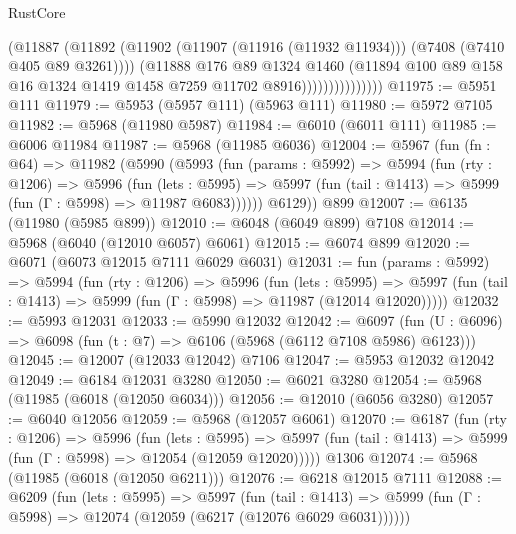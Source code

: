 \begin{lexlean}{RustCore}
\begin{coremodule}
                            (@11887
                              (@11892
                                (@11902
                                  (@11907 (@11916 (@11932 @11934)))
                                  (@7408 (@7410 @405 @89 @3261))))
                              (@11888
                                @176
                                @89
                                @1324
                                @1460
                                (@11894
                                  @100
                                  @89
                                  @158
                                  @16
                                  @1324
                                  @1419
                                  @1458
                                  @7259
                                  @11702
                                  @8916)))))))))))))))
@11975 := @5951 @111
@11979 := @5953 (@5957 @111) (@5963 @111)
@11980 := @5972 @7105
@11982 := @5968 (@11980 @5987)
@11984 := @6010 (@6011 @111)
@11985 := @6006 @11984
@11987 := @5968 (@11985 @6036)
@12004 := @5967
    (fun (fn : @64) =>
    @11982
      (@5990
        (@5993
          (fun (params : @5992) =>
          @5994
            (fun (rty : @1206) =>
            @5996
              (fun (lets : @5995) =>
              @5997 (fun (tail : @1413) => @5999 (fun (Γ : @5998) => @11987 @6083))))))
        @6129))
    @899
@12007 := @6135 (@11980 (@5985 @899))
@12010 := @6048 (@6049 @899) @7108
@12014 := @5968 (@6040 (@12010 @6057) @6061)
@12015 := @6074 @899
@12020 := @6071 (@6073 @12015 @7111 @6029 @6031)
@12031 := fun (params : @5992) =>
  @5994
    (fun (rty : @1206) =>
    @5996
      (fun (lets : @5995) =>
      @5997 (fun (tail : @1413) => @5999 (fun (Γ : @5998) => @11987 (@12014 @12020)))))
@12032 := @5993 @12031
@12033 := @5990 @12032
@12042 := @6097 (fun (U : @6096) => @6098 (fun (t : @7) => @6106 (@5968 (@6112 @7108 @5986) @6123)))
@12045 := @12007 (@12033 @12042) @7106
@12047 := @5953 @12032 @12042
@12049 := @6184 @12031 @3280
@12050 := @6021 @3280
@12054 := @5968 (@11985 (@6018 (@12050 @6034)))
@12056 := @12010 (@6056 @3280)
@12057 := @6040 @12056
@12059 := @5968 (@12057 @6061)
@12070 := @6187
    (fun (rty : @1206) =>
    @5996
      (fun (lets : @5995) =>
      @5997 (fun (tail : @1413) => @5999 (fun (Γ : @5998) => @12054 (@12059 @12020)))))
    @1306
@12074 := @5968 (@11985 (@6018 (@12050 @6211)))
@12076 := @6218 @12015 @7111
@12088 := @6209
    (fun (lets : @5995) =>
    @5997
      (fun (tail : @1413) =>
      @5999 (fun (Γ : @5998) => @12074 (@12059 (@6217 (@12076 @6029 @6031))))))

\end{coremodule}
\end{lexlean}
